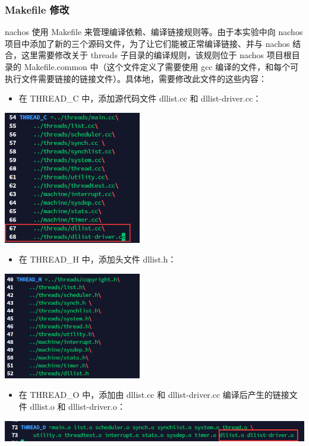 \documentclass[a4paper,12pt]{article}
\begin{document}
\subsubsection{Makefile 修改}
\par nachos 使用 Makefile 来管理编译依赖、编译链接规则等。由于本实验中向 nachos 项目中添加了新的三个源码文件，为了让它们能被正常编译链接、并与 nachos 结合，这里需要修改关于 threads 子目录的编译规则，该规则位于 nachos 项目根目录的 Makefile.common 中（这个文件定义了需要使用 gcc 编译的文件，和每个可执行文件需要链接的链接文件）。具体地，需要修改此文件的这些内容：
\begin{itemize}
    \item 在 THREAD\_C 中，添加源代码文件 dllist.cc 和 dllist-driver.cc：
\end{itemize}
\begin{center}
    \includegraphics[width=6cm]{images/result/1.png}
\end{center}

\begin{itemize}
    \item 在 THREAD\_H 中，添加头文件 dllist.h：
\end{itemize}
\begin{center}
    \includegraphics[width=6cm]{images/result/2.png}
\end{center}

\begin{itemize}
    \item 在 THREAD\_O 中，添加由 dllist.cc 和 dllist-driver.cc 编译后产生的链接文件 dllist.o 和 dllist-driver.o：
\end{itemize}
\begin{center}
    \includegraphics[width=16cm]{images/result/3.png}
\end{center}
\end{document}
